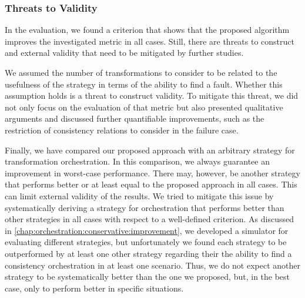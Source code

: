 



\subsubsection{Threats to Validity}

In the evaluation, we found a criterion that shows that the proposed algorithm improves the investigated metric in all cases.
Still, there are threats to construct and external validity that need to be mitigated by further studies.

We assumed the number of transformations to consider to be related to the usefulness of the strategy in terms of the ability to find a fault.
Whether this assumption holds is a threat to construct validity.
To mitigate this threat, we did not only focus on the evaluation of that metric but also presented qualitative arguments and discussed further quantifiable improvements, such as the restriction of consistency relations to consider in the failure case.

Finally, we have compared our proposed approach with an arbitrary strategy for transformation orchestration.
In this comparison, we always guarantee an improvement in worst-case performance.
There may, however, be another strategy that performs better or at least equal to the proposed approach in all cases.
This can limit external validity of the results.
We tried to mitigate this issue by systematically deriving a strategy for orchestration that performs better than other strategies in all cases with respect to a well-defined criterion.
As discussed in \autoref{chap:orchestration:conservative:improvement}, we developed a simulator for evaluating different strategies, but unfortunately we found each strategy to be outperformed by at least one other strategy regarding their the ability to find a consistency orchestration in at least one scenario.
Thus, we do not expect another strategy to be systematically better than the one we proposed, but, in the best case, only to perform better in specific situations.


